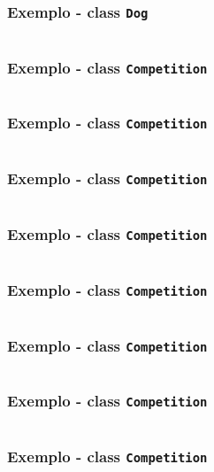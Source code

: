 \documentclass{beamer}
\begin{document}
	\begin{frame}[fragile]
		\frametitle{Exemplo - class \texttt{Dog}}
		\inputminted[breaklines, firstline=59, lastline=66]{python}{classExample.py}
	\end{frame}
	
	\begin{frame}[fragile]
		\frametitle{Exemplo - class \texttt{Competition}}
		\inputminted[breaklines, firstline=69, lastline=76]{python}{classExample.py}
	\end{frame}
	
	\begin{frame}[fragile]
		\frametitle{Exemplo - class \texttt{Competition}}
		\inputminted[breaklines, firstline=78, lastline=87]{python}{classExample.py}
	\end{frame}
	
	\begin{frame}[fragile]
		\frametitle{Exemplo - class \texttt{Competition}}
		\inputminted[breaklines, firstline=88, lastline=94]{python}{classExample.py}
	\end{frame}
	
	\begin{frame}[fragile]
		\frametitle{Exemplo - class \texttt{Competition}}
		\inputminted[breaklines, firstline=96, lastline=103]{python}{classExample.py}
	\end{frame}
	
	\begin{frame}[fragile]
		\frametitle{Exemplo - class \texttt{Competition}}
		\inputminted[breaklines, firstline=104, lastline=107]{python}{classExample.py}
	\end{frame}
	
	\begin{frame}[fragile]
		\frametitle{Exemplo - class \texttt{Competition}}
		\inputminted[breaklines, firstline=109, lastline=113]{python}{classExample.py}
	\end{frame}
	
	\begin{frame}[fragile]
		\frametitle{Exemplo - class \texttt{Competition}}
		\inputminted[breaklines, firstline=115, lastline=124]{python}{classExample.py}
	\end{frame}
	
	\begin{frame}[fragile]
		\frametitle{Exemplo - class \texttt{Competition}}
		\inputminted[breaklines, firstline=125, lastline=133]{python}{classExample.py}
	\end{frame}
	
\end{document}
